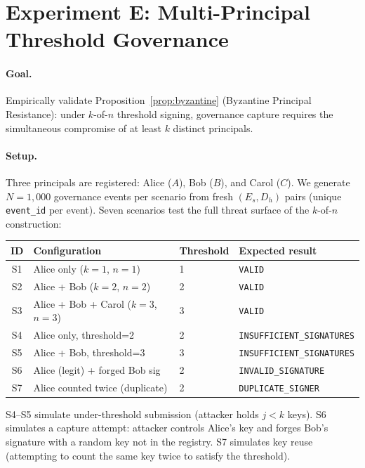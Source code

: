 \documentclass[11pt]{article}
\newcommand{\Es}{E_s}
\newcommand{\Dh}{D_h}
\begin{document}
\section{Experiment E: Multi-Principal Threshold Governance}
\label{sec:exp_e}

\paragraph{Goal.} Empirically validate Proposition~\ref{prop:byzantine}
(Byzantine Principal Resistance): under $k$-of-$n$ threshold signing,
governance capture requires the simultaneous compromise of at least
$k$ distinct principals.

\paragraph{Setup.} Three principals are registered: Alice ($A$),
Bob ($B$), and Carol ($C$). We generate $N = 1{,}000$ governance
events per scenario from fresh $(\Es, \Dh)$ pairs (unique
\texttt{event\_id} per event). Seven scenarios test the full
threat surface of the $k$-of-$n$ construction:

\begin{center}
\small
\begin{tabular}{clll}
\toprule
ID & Configuration & Threshold & Expected result \\
\midrule
S1 & Alice only ($k=1$, $n=1$)         & 1 & \texttt{VALID} \\
S2 & Alice + Bob ($k=2$, $n=2$)        & 2 & \texttt{VALID} \\
S3 & Alice + Bob + Carol ($k=3$, $n=3$)& 3 & \texttt{VALID} \\
S4 & Alice only, threshold=2           & 2 & \texttt{INSUFFICIENT\_SIGNATURES} \\
S5 & Alice + Bob, threshold=3          & 3 & \texttt{INSUFFICIENT\_SIGNATURES} \\
S6 & Alice (legit) + forged Bob sig    & 2 & \texttt{INVALID\_SIGNATURE} \\
S7 & Alice counted twice (duplicate)   & 2 & \texttt{DUPLICATE\_SIGNER} \\
\bottomrule
\end{tabular}
\end{center}

S4--S5 simulate under-threshold submission (attacker holds $j < k$
keys). S6 simulates a capture attempt: attacker controls Alice's key
and forges Bob's signature with a random key not in the registry.
S7 simulates key reuse (attempting to count the same key twice to
satisfy the threshold).
\end{document}
